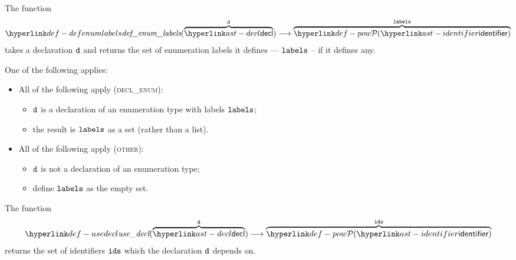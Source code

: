 \hypertarget{def-defenumlabels}{}
The function
\[
\defenumlabels(\overname{\decl}{\vd}) \aslto \overname{\pow{\identifier}}{\vlabels}
\]
takes a declaration $\texttt{d}$ and returns the set of enumeration labels it defines --- $\texttt{labels}$ --
if it defines any.

\ProseParagraph
One of the following applies:
\begin{itemize}
  \item All of the following apply (\textsc{decl\_enum}):
  \begin{itemize}
    \item $\texttt{d}$ is a declaration of an enumeration type with labels $\texttt{labels}$;
    \item the result is $\texttt{labels}$ as a set (rather than a list).
  \end{itemize}

  \item All of the following apply (\textsc{other}):
  \begin{itemize}
    \item $\texttt{d}$ is not a declaration of an enumeration type;
    \item define $\texttt{labels}$ as the empty set.
  \end{itemize}
\end{itemize}


\hypertarget{def-usedecl}{}
The function
\[
\usedecl(\overname{\decl}{\vd}) \aslto \overname{\pow{\identifier}}{\ids}
\]
returns the set of identifiers $\texttt{ids}$ which the declaration $\texttt{d}$ depends on.

